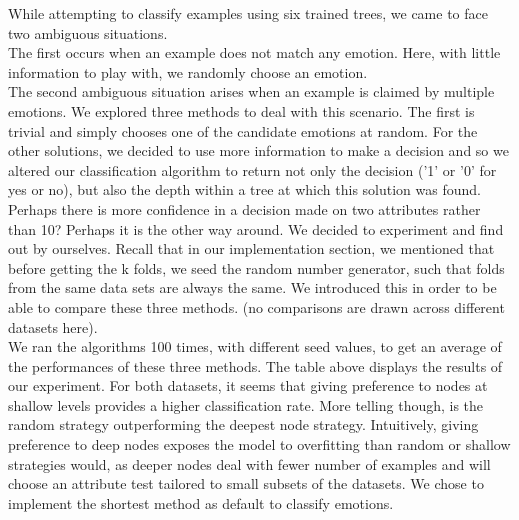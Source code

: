 While attempting to classify examples using six trained trees, we came to face two ambiguous situations.\\
The first occurs when an example does not match any emotion.
Here, with little information to play with, we randomly choose an emotion.\\
The second ambiguous situation arises when an example is claimed by multiple emotions.
We explored three methods to deal with this scenario.
The first is trivial and simply chooses one of the candidate emotions at random.
For the other solutions, we decided to use more information to make a decision and so we altered our classification algorithm
to return not only the decision ('1' or '0' for yes or no), but also the depth within a tree at which this solution was found.
Perhaps there is more confidence in a decision made on two attributes rather than 10? Perhaps it is the other way around.
We decided to experiment and find out by ourselves. Recall that in our implementation section, we mentioned that before getting
the k folds, we seed the random number generator, such that folds from the same data sets are always the same. We introduced this
in order to be able to compare these three methods. (no comparisons are drawn across different datasets here). \\







We ran the algorithms 100 times, with different seed values, to get an average of the performances of these three methods.
The table above displays the results of our experiment.
For both datasets, it seems that giving preference to nodes at shallow levels provides a higher classification rate.
More telling though, is the random strategy outperforming the deepest node strategy.
Intuitively, giving preference to deep nodes exposes the model to overfitting than random or shallow strategies would, as deeper nodes
deal with fewer number of examples and will choose an attribute test tailored to small subsets of the datasets.
We chose to implement the shortest method as default to classify emotions.

